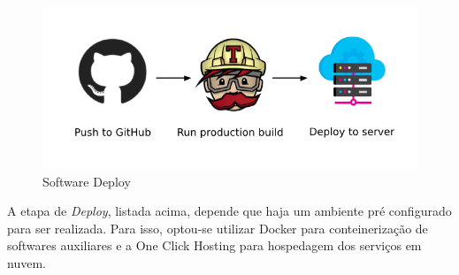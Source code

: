 \begin{figure}[H]
    \centering
    \includegraphics[width=1.0\textwidth]{figuras/deploy-continuous.png}
    \caption{Software Deploy}
    \label{fig:software_deploy}
\end{figure}

A etapa de \emph{Deploy}, listada acima, depende que haja um ambiente pré configurado para ser realizada. Para isso, optou-se utilizar Docker para conteinerização de softwares auxiliares e a One Click Hosting para hospedagem dos serviços em nuvem.



